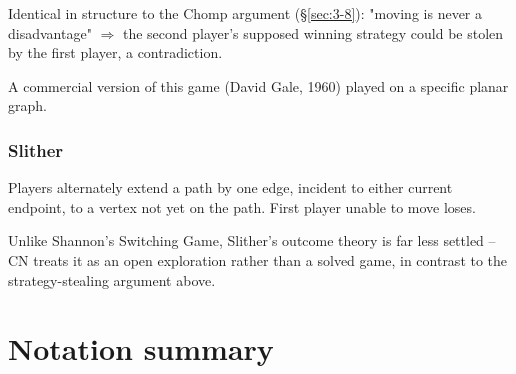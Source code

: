 \documentclass[11pt]{article}
\begin{document}
\begin{note}
Identical in structure to the Chomp argument (\S\ref{sec:3-8}): "moving is never a disadvantage" $\Rightarrow$ the second player's supposed winning strategy could be stolen by the first player, a contradiction.
\end{note}

\begin{note}[Bridg-It]
A commercial version of this game (David Gale, 1960) played on a specific planar graph.
\end{note}

\subsubsection{Slither}
\label{sec:12-6-2}

\begin{definition}[Slither]
Players alternately extend a path by one edge, incident to either current endpoint, to a vertex not yet on the path. First player unable to move loses.
\end{definition}

\begin{note}
Unlike Shannon's Switching Game, Slither's outcome theory is far less settled -- CN treats it as an open exploration rather than a solved game, in contrast to the strategy-stealing argument above.
\end{note}


\newpage
\section*{Notation summary}
\end{document}
